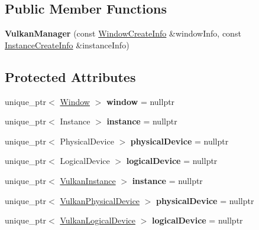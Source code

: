 \subsection*{Public Member Functions}
\begin{DoxyCompactItemize}
\item 
\mbox{\label{classeff_1_1VulkanManager_a08aa2d0d8d09af48179903772da42c63}} 
{\bfseries Vulkan\+Manager} (const \mbox{\hyperlink{structeff_1_1VulkanManager_1_1WindowCreateInfo}{Window\+Create\+Info}} \&window\+Info, const \mbox{\hyperlink{structeff_1_1VulkanManager_1_1InstanceCreateInfo}{Instance\+Create\+Info}} \&instance\+Info)
\end{DoxyCompactItemize}
\subsection*{Protected Attributes}
\begin{DoxyCompactItemize}
\item 
\mbox{\label{classeff_1_1VulkanManager_a7a9011b6b689cc8843c156992dbac3f3}} 
unique\+\_\+ptr$<$ \mbox{\hyperlink{classeff_1_1VulkanManager_1_1Window}{Window}} $>$ {\bfseries window} = nullptr
\item 
\mbox{\label{classeff_1_1VulkanManager_a6b0c5603c630ede57b9dc34242be403e}} 
unique\+\_\+ptr$<$ Instance $>$ {\bfseries instance} = nullptr
\item 
\mbox{\label{classeff_1_1VulkanManager_a1967c69fc6f66993cf0744d5f53da3f8}} 
unique\+\_\+ptr$<$ Physical\+Device $>$ {\bfseries physical\+Device} = nullptr
\item 
\mbox{\label{classeff_1_1VulkanManager_a3bb5a18e549d276fa0b057eac9f0cd2c}} 
unique\+\_\+ptr$<$ Logical\+Device $>$ {\bfseries logical\+Device} = nullptr
\item 
\mbox{\label{classeff_1_1VulkanManager_ae5c477fd0f8dd6f512502865a5a1785a}} 
unique\+\_\+ptr$<$ \mbox{\hyperlink{classeff_1_1VulkanManager_1_1VulkanInstance}{Vulkan\+Instance}} $>$ {\bfseries instance} = nullptr
\item 
\mbox{\label{classeff_1_1VulkanManager_aa0e7431723f6c1eaf93eec8b38ca12b1}} 
unique\+\_\+ptr$<$ \mbox{\hyperlink{classeff_1_1VulkanManager_1_1VulkanPhysicalDevice}{Vulkan\+Physical\+Device}} $>$ {\bfseries physical\+Device} = nullptr
\item 
\mbox{\label{classeff_1_1VulkanManager_ad4f2af718ddaa3abd40639528871a2ce}} 
unique\+\_\+ptr$<$ \mbox{\hyperlink{classeff_1_1VulkanManager_1_1VulkanLogicalDevice}{Vulkan\+Logical\+Device}} $>$ {\bfseries logical\+Device} = nullptr
\end{DoxyCompactItemize}


